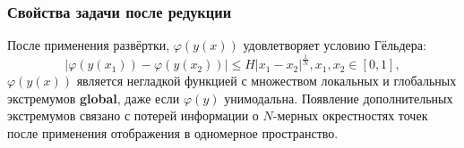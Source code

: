 \documentclass[aspectratio=1610]{beamer}
\begin{document}
\begin{frame}
  \frametitle{Свойства задачи после редукции}
  После применения развёртки, \(\varphi(y(x))\) удовлетворяет условию Гёльдера:
  \begin{displaymath}
    |\varphi(y(x_1))-\varphi(y(x_2))|\leq H{|x_1-x_2|}^{\frac{1}{N}}, x_1,x_2\in[0,1],
  \end{displaymath}
  \(\varphi(y(x))\) является негладкой функцией с множеством локальных и глобальных экстремумов \textbf{global}, даже если \(\varphi(y)\) унимодальна.
  Появление дополнительных экстремумов связано с потерей информации о \(N\)-мерных окрестностях точек после применения отображения в одномерное пространство.

  \begin{figure}[ht]
    \begin{center}
    \vspace*{-0.5cm}
  \end{center}
  \end{figure}
\end{frame}
\end{document}
